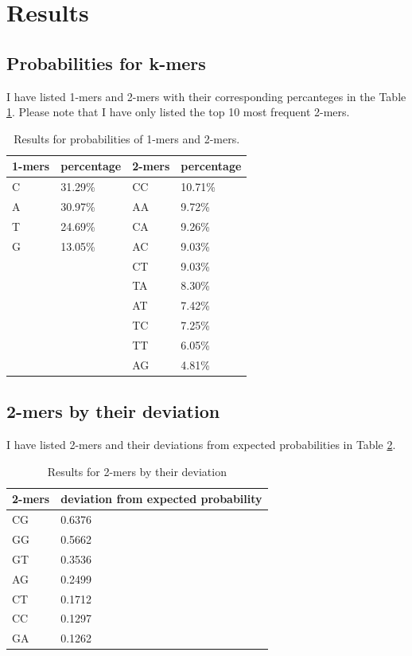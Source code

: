 \documentclass[a4paper,11pt]{article}
\begin{document}
\section{Results}

\subsection{Probabilities for k-mers}
I have listed 1-mers and 2-mers with their corresponding percanteges in the Table \ref{kmers}. Please note that I have only listed the top 10 most frequent 2-mers.
\begin{table}[htbp]
\caption{Results for probabilities of 1-mers and 2-mers.}
\label{kmers}
\begin{center}
\begin{tabular}{lllp{4cm}}
\hline
1-mers & percentage  & 2-mers & percentage \\
\hline
C & 31.29\% & CC & 10.71\%\\
A & 30.97\% & AA & 9.72\%\\
T & 24.69\% & CA & 9.26\%\\
G & 13.05\% & AC & 9.03\%\\
 &  & CT & 9.03\%\\
 &  & TA & 8.30\%\\
 &  & AT & 7.42\%\\
 &  & TC & 7.25\%\\
 &  & TT & 6.05\%\\
 &  & AG & 4.81\%\\

\hline
\end{tabular}
\end{center}
\end{table}

\subsection{2-mers by their deviation}
I have listed 2-mers and their deviations from expected probabilities in Table \ref{deviations}.
\begin{table}[htbp]
\caption{Results for 2-mers by their deviation}
\label{deviations}
\begin{center}
\begin{tabular}{lp{4cm}}
\hline
2-mers & deviation from expected probability\\
\hline
CG & 0.6376\\
GG & 0.5662\\
GT & 0.3536\\
AG & 0.2499\\
CT & 0.1712\\
CC & 0.1297\\
GA & 0.1262\\



\hline
\end{tabular}
\end{center}
\end{table}
\end{document}
